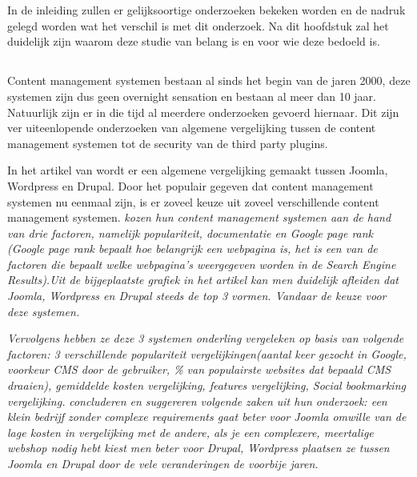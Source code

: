 
\chapter{}
\label{ch:inleiding}

In de inleiding zullen er gelijksoortige onderzoeken bekeken worden en de nadruk gelegd worden wat het verschil is met dit onderzoek. Na dit hoofdstuk zal het duidelijk zijn waarom deze studie van belang is en voor wie deze bedoeld is.
\section{}
\label{sec:probleemstelling}
Content management systemen bestaan al sinds het begin van de jaren 2000, deze systemen zijn dus geen overnight sensation en bestaan al meer dan 10 jaar. Natuurlijk zijn er in die tijd al meerdere onderzoeken gevoerd hiernaar. Dit zijn ver uiteenlopende onderzoeken van algemene vergelijking tussen de content management systemen tot de security van de third party plugins. 

In het artikel van \textcite{Patel2011} wordt er een algemene vergelijking gemaakt tussen Joomla, Wordpress en Drupal. Door het populair gegeven dat content management systemen nu eenmaal zijn, is er zoveel keuze uit zoveel verschillende content management systemen.
\textcite{Patel2011} \textit{kozen hun content management systemen aan de hand van drie factoren, namelijk populariteit, documentatie en Google page rank (Google page rank bepaalt hoe belangrijk een webpagina is, het is een van de factoren die bepaalt welke webpagina's weergegeven worden in de Search Engine Results).Uit de bijgeplaatste grafiek in het artikel kan men duidelijk afleiden dat Joomla, Wordpress en Drupal steeds de top 3 vormen. Vandaar de keuze voor deze systemen.}\autocite{Patel2011}

\textit{Vervolgens hebben ze deze 3 systemen onderling vergeleken op basis van volgende factoren: 3 verschillende populariteit vergelijkingen(aantal keer gezocht in Google, voorkeur CMS door de gebruiker, \% van populairste websites dat bepaald CMS draaien), gemiddelde kosten vergelijking, features vergelijking, Social bookmarking vergelijking.} \textcite{Patel2011} \textit{concluderen en suggereren volgende zaken uit hun onderzoek: een klein bedrijf zonder complexe requirements gaat beter voor Joomla omwille van de lage kosten in vergelijking met de andere, als je een complexere, meertalige webshop nodig hebt kiest men beter voor Drupal, Wordpress plaatsen ze tussen Joomla en Drupal door de vele veranderingen de voorbije jaren.} \autocite{Patel2011}

